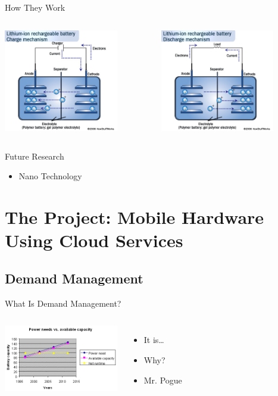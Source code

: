 \documentclass{beamer}
\begin{document}
\begin{frame}{How They Work}
  \begin{columns}
    \begin{column}{5cm}
      \includegraphics[width=5cm]{lionCharge.jpg}
    \end{column}
    \begin{column}{5cm}
      \includegraphics[width=5cm]{lionDischarge.jpg}
    \end{column}
  \end{columns}
\end{frame}

\begin{frame}{Future Research}
  \begin{itemize}
  \item Nano Technology
  \end{itemize}
\end{frame}

\section[Research Project]{The Project: Mobile Hardware Using Cloud Services}

\subsection{Demand Management}

\begin{frame}{What Is Demand Management? }
  \begin{columns}
    \column{5cm}
      \includegraphics[width=5cm]{demandGraph.png}
    \column{5cm}
    \begin{itemize}
    \item It is\dots
    \item Why?
    \item Mr. Pogue
    \end{itemize}
  \end{columns}
\end{frame}
\end{document}
